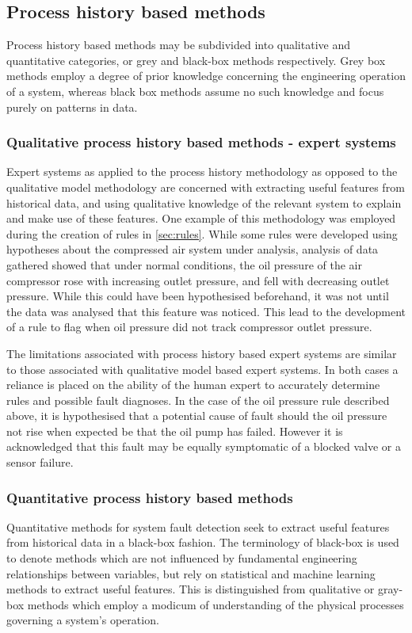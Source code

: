 \subsection{Process history based methods}
Process history based methods may be subdivided into qualitative and quantitative categories, or grey and black-box methods respectively. Grey box methods employ a degree of prior knowledge concerning the engineering operation of a system, whereas black box methods assume no such knowledge and focus purely on patterns in data.

\subsubsection{Qualitative process history based methods - expert systems}
\label{subsubsec:prochistexpert}
Expert systems as applied to the process history methodology as opposed to the qualitative model methodology are concerned with extracting useful features from historical data, and using qualitative knowledge of the relevant system to explain and make use of these features.
One example of this methodology was employed during the creation of rules in \autoref{sec:rules}. While some rules were developed using hypotheses about the compressed air system under analysis, analysis of data gathered showed that under normal conditions, the oil pressure of the air compressor rose with increasing outlet pressure, and fell with decreasing outlet pressure. While this could have been hypothesised beforehand, it was not until the data was analysed that this feature was noticed. This lead to the development of a rule to flag when oil pressure did not track compressor outlet pressure.

The limitations associated with process history based expert systems are similar to those associated with qualitative model based expert systems. In both cases a reliance is placed on the ability of the human expert to accurately determine rules and possible fault diagnoses. In the case of the oil pressure rule described above, it is hypothesised that a potential cause of fault should the oil pressure not rise when expected be that the oil pump has failed. However it is acknowledged that this fault may be equally symptomatic of a blocked valve or a sensor failure.

\subsubsection{Quantitative process history based methods}
Quantitative methods for system fault detection seek to extract useful features from historical data in a black-box fashion. The terminology of black-box is used to denote methods which are not influenced by fundamental engineering relationships between variables, but rely on statistical and machine learning methods to extract useful features. This is distinguished from qualitative or gray-box methods which employ a modicum of understanding of the physical processes governing a system’s operation.

